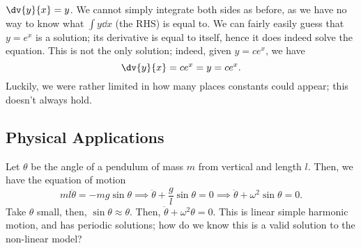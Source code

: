 \begin{example}
    $\dv{y}{x} = y$. We cannot simply integrate both sides as before, as we have no way to know what $\int y \dd{x}$ (the RHS) is equal to. We can fairly easily guess that $y = e^x$ is a solution; its derivative is equal to itself, hence it does indeed solve the equation. This is not the only solution; indeed, given $y = c e^x$, we have \[
    \dv{y}{x} = c e^x = y = ce^x.    
    \]
    Luckily, we were rather limited in how many places constants could appear; this doesn't always hold.
\end{example}

\subsection{Physical Applications}

\begin{example}
    Let $\theta$ be the angle of a pendulum of mass $m$ from vertical and length $l$. Then, we have the equation of motion \[
    m l \ddot{\theta} = - mg \sin \theta \implies \ddot{\theta} + \frac{g}{l} \sin \theta = 0 \implies \ddot{\theta} + \omega^2 \sin \theta = 0.
    \]
    Take $\theta$ small, then, $\sin \theta \approx \theta$. Then, $\ddot{\theta} + \omega^2 \theta = 0$. This is linear simple harmonic motion, and has periodic solutions; how do we know this is a valid solution to the non-linear model?
\end{example}
